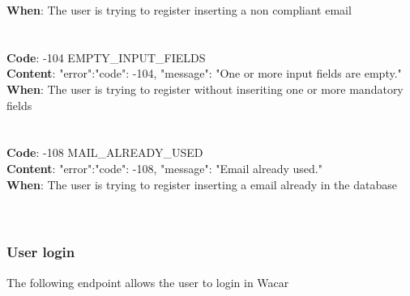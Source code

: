 \begin{itemize}
    \textbf{When}: The user is trying to register inserting a non compliant email\\
    \\
    \\
    \textbf{Code}: -104 EMPTY\_INPUT\_FIELDS\\
    \textbf{Content}: {"error":{"code": -104, "message": "One or more input fields are empty."}}\\
    \textbf{When}: The user is trying to register without inseriting one or more mandatory fields\\
    \\
    \\
    \textbf{Code}: -108 MAIL\_ALREADY\_USED\\
    \textbf{Content}: {"error":{"code": -108, "message": "Email already used."}}\\
    \textbf{When}: The user is trying to register inserting a email already in the database\\
    \\
    \\
\end{itemize}


\subsubsection*{User login}


The following endpoint allows the user to login in Wacar

